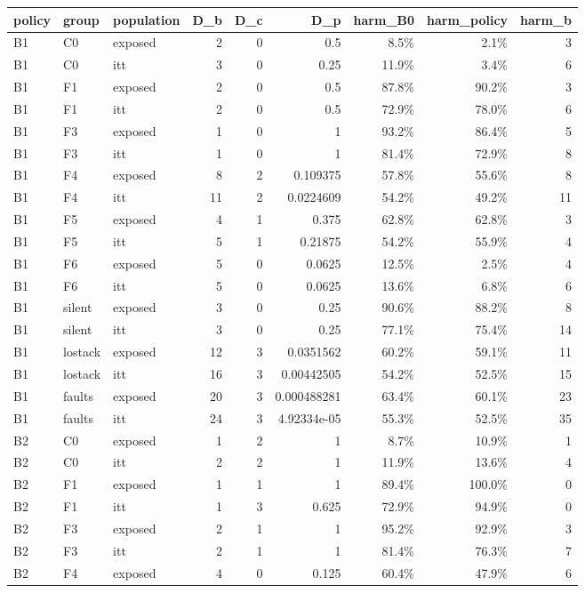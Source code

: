 \begin{tabular}{lllrrrrrr}
\toprule
policy & group & population & D\_b & D\_c & D\_p & harm\_B0 & harm\_policy & harm\_b \\
\midrule
B1 & C0 & exposed & 2 & 0 & 0.5 & 8.5\% & 2.1\% & 3 \\
B1 & C0 & itt & 3 & 0 & 0.25 & 11.9\% & 3.4\% & 6 \\
B1 & F1 & exposed & 2 & 0 & 0.5 & 87.8\% & 90.2\% & 3 \\
B1 & F1 & itt & 2 & 0 & 0.5 & 72.9\% & 78.0\% & 6 \\
B1 & F3 & exposed & 1 & 0 & 1 & 93.2\% & 86.4\% & 5 \\
B1 & F3 & itt & 1 & 0 & 1 & 81.4\% & 72.9\% & 8 \\
B1 & F4 & exposed & 8 & 2 & 0.109375 & 57.8\% & 55.6\% & 8 \\
B1 & F4 & itt & 11 & 2 & 0.0224609 & 54.2\% & 49.2\% & 11 \\
B1 & F5 & exposed & 4 & 1 & 0.375 & 62.8\% & 62.8\% & 3 \\
B1 & F5 & itt & 5 & 1 & 0.21875 & 54.2\% & 55.9\% & 4 \\
B1 & F6 & exposed & 5 & 0 & 0.0625 & 12.5\% & 2.5\% & 4 \\
B1 & F6 & itt & 5 & 0 & 0.0625 & 13.6\% & 6.8\% & 6 \\
B1 & silent & exposed & 3 & 0 & 0.25 & 90.6\% & 88.2\% & 8 \\
B1 & silent & itt & 3 & 0 & 0.25 & 77.1\% & 75.4\% & 14 \\
B1 & lostack & exposed & 12 & 3 & 0.0351562 & 60.2\% & 59.1\% & 11 \\
B1 & lostack & itt & 16 & 3 & 0.00442505 & 54.2\% & 52.5\% & 15 \\
B1 & faults & exposed & 20 & 3 & 0.000488281 & 63.4\% & 60.1\% & 23 \\
B1 & faults & itt & 24 & 3 & 4.92334e-05 & 55.3\% & 52.5\% & 35 \\
B2 & C0 & exposed & 1 & 2 & 1 & 8.7\% & 10.9\% & 1 \\
B2 & C0 & itt & 2 & 2 & 1 & 11.9\% & 13.6\% & 4 \\
B2 & F1 & exposed & 1 & 1 & 1 & 89.4\% & 100.0\% & 0 \\
B2 & F1 & itt & 1 & 3 & 0.625 & 72.9\% & 94.9\% & 0 \\
B2 & F3 & exposed & 2 & 1 & 1 & 95.2\% & 92.9\% & 3 \\
B2 & F3 & itt & 2 & 1 & 1 & 81.4\% & 76.3\% & 7 \\
B2 & F4 & exposed & 4 & 0 & 0.125 & 60.4\% & 47.9\% & 6 \\

\end{tabular}
